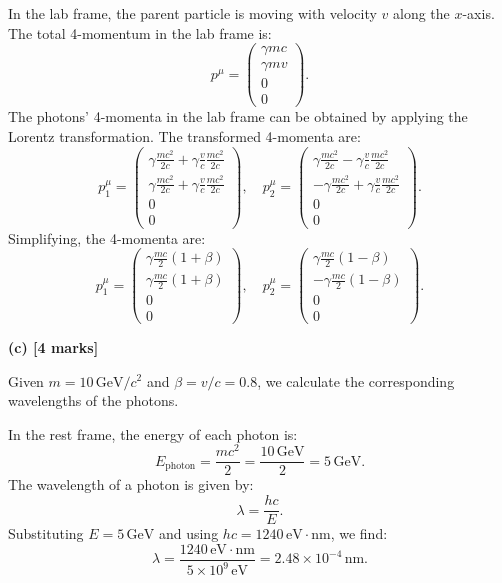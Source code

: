 \documentclass{article}
\begin{document}
In the lab frame, the parent particle is moving with velocity \(v\) along the \(x\)-axis. The total 4-momentum in the lab frame is:
\[
p^\mu = \begin{pmatrix}
\gamma mc \\
\gamma mv \\
0 \\
0
\end{pmatrix}.
\]
The photons’ 4-momenta in the lab frame can be obtained by applying the Lorentz transformation. The transformed 4-momenta are:
\[
p_1^\mu = \begin{pmatrix}
\gamma \frac{mc^2}{2c} + \gamma \frac{v}{c} \frac{mc^2}{2c} \\
\gamma \frac{mc^2}{2c} + \gamma \frac{v}{c} \frac{mc^2}{2c} \\
0 \\
0
\end{pmatrix}, \quad
p_2^\mu = \begin{pmatrix}
\gamma \frac{mc^2}{2c} - \gamma \frac{v}{c} \frac{mc^2}{2c} \\
-\gamma \frac{mc^2}{2c} + \gamma \frac{v}{c} \frac{mc^2}{2c} \\
0 \\
0
\end{pmatrix}.
\]
Simplifying, the 4-momenta are:
\[
p_1^\mu = \begin{pmatrix}
\gamma \frac{mc}{2} (1 + \beta) \\
\gamma \frac{mc}{2} (1 + \beta) \\
0 \\
0
\end{pmatrix}, \quad
p_2^\mu = \begin{pmatrix}
\gamma \frac{mc}{2} (1 - \beta) \\
-\gamma \frac{mc}{2} (1 - \beta) \\
0 \\
0
\end{pmatrix}.
\]

\textbf{(c) [4 marks]}

Given \(m = 10 \, \text{GeV}/c^2\) and \(\beta = v/c = 0.8\), we calculate the corresponding wavelengths of the photons. 

In the rest frame, the energy of each photon is:
\[
E_\text{photon} = \frac{mc^2}{2} = \frac{10 \, \text{GeV}}{2} = 5 \, \text{GeV}.
\]
The wavelength of a photon is given by:
\[
\lambda = \frac{hc}{E}.
\]
Substituting \(E = 5 \, \text{GeV}\) and using \(hc = 1240 \, \text{eV} \cdot \text{nm}\), we find:
\[
\lambda = \frac{1240 \, \text{eV} \cdot \text{nm}}{5 \times 10^9 \, \text{eV}} = 2.48 \times 10^{-4} \, \text{nm}.
\]
\end{document}
